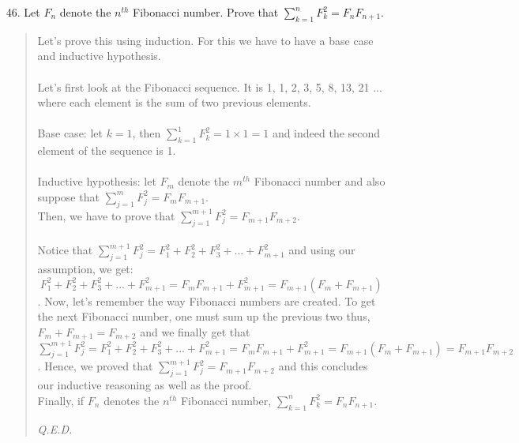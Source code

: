 \documentclass[12pt, a4paper]{article}                      %
\begin{document}
\begin{itemize}
\item[46.]
Let $F_n$ denote the $n^{th}$ Fibonacci number. Prove that $\displaystyle\sum_{k=1}^{n} F^2_k = F_nF_{n + 1}$.
\begin{quote}
Let's prove this using induction. For this we have to have a base case and inductive hypothesis.\\\\
Let's first look at the Fibonacci sequence. It is 1, 1, 2, 3, 5, 8, 13, 21 ... where each element is the
sum of two previous elements.\\\\
Base case: let $k = 1$, then $\displaystyle\sum_{k=1}^{1} F^2_k = 1 \times 1 = 1$ and indeed the second
element of the sequence is 1.\\\\
Inductive hypothesis: let $F_m$ denote the $m^{th}$ Fibonacci number and also suppose that $\displaystyle\sum_{j=1}^{m} F^2_j = F_mF_{m + 1}$.\\
Then, we have to prove that $\displaystyle\sum_{j=1}^{m + 1} F^2_j = F_{m + 1}F_{m + 2}$.\\\\
Notice that $\displaystyle\sum_{j=1}^{m + 1} F^2_j = F_1^2 + F_2^2 + F_3^2 + ... + F_{m + 1}^2$ and using our assumption, we get:
$$F_1^2 + F_2^2 + F_3^2 + ... + F_{m + 1}^2 = F_mF_{m + 1} + F_{m + 1}^2 = F_{m + 1}(F_m + F_{m + 1})$$.
Now, let's remember the way Fibonacci numbers are created. To get the next Fibonacci number, one must sum up the previous two
thus, $F_m + F_{m + 1} = F_{m + 2}$ and we finally get that $\displaystyle\sum_{j=1}^{m + 1} F^2_j = F_1^2 + F_2^2 + F_3^2 + ... + F_{m + 1}^2 = F_mF_{m + 1} + F_{m + 1}^2 = F_{m + 1}(F_m + F_{m + 1}) = F_{m + 1}F_{m + 2}$.
Hence, we proved that $\displaystyle\sum_{j=1}^{m + 1} F^2_j = F_{m + 1}F_{m + 2}$ and this concludes our inductive reasoning as well as the proof.\\
Finally, if $F_n$ denotes the $n^{th}$ Fibonacci number, $\displaystyle\sum_{k=1}^{n} F^2_k = F_nF_{n + 1}$.
\begin{flushright}
\textit{Q.E.D.}
\end{flushright}
\end{quote}

\item[]
\item[]
\item[]


\end{itemize}
\end{document}

